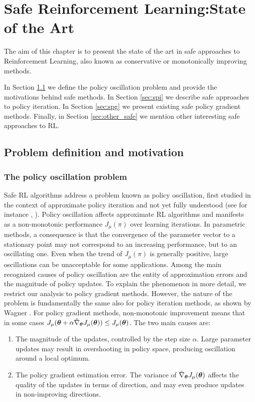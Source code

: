 \chapter{Safe Reinforcement Learning:\newline State of the Art}
The aim of this chapter is to present the state of the art in safe approaches to Reinforcement Learning, also known as conservative or monotonically improving methods. 

In Section \ref{sec:safe_def} we define the policy oscillation problem and provide the motivations behind safe methods. In Section \ref{sec:spi} we describe safe approaches to policy iteration. In Section \ref{sec:spg} we present existing safe policy gradient methods. Finally, in Section \ref{sec:other_safe} we mention other interesting safe approaches to \ac{RL}.

\section{Problem definition and motivation} \label{sec:safe_def}
\subsection{The policy oscillation problem}
Safe \ac{RL} algorithms address a problem known as policy oscillation, first studied in the context of approximate policy iteration and not yet fully understood (see for instance \cite{Bertsekas2011api}, \cite{wagner2011reinterpretation}). Policy oscillation affects approximate \ac{RL} algorithms and manifests as a non-monotonic performance $J_\mu(\pi)$ over learning iterations. In parametric methods, a consequence is that the convergence of the parameter vector to a stationary point may not correspond to an increasing performance, but to an oscillating one. Even when the trend of $J_\mu(\pi)$ is generally positive, large oscillations can be unacceptable for some applications.
Among the main recognized causes of policy oscillation are the entity of approximation errors and the magnitude of policy updates.
To explain the phenomenon in more detail, we restrict our analysis to policy gradient methods. However, the nature of the problem is fundamentally the same also for policy iteration methods, as shown by Wagner \cite{wagner2011reinterpretation}. For policy gradient methods, non-monotonic improvement means that in some cases $J_\mu(\boldsymbol{\theta}+\alpha\hat{\nabla}_{\boldsymbol{\theta}}J_{\mu}(\boldsymbol{\theta})) \leq J_\mu(\boldsymbol{\theta})$. The two main causes are:
\begin{enumerate}
\item The magnitude of the updates, controlled by the step size $\alpha$. Large parameter updates may result in overshooting in policy space, producing oscillation around a local optimum.
\item The policy gradient estimation error. The variance of $\hat{\nabla}_{\boldsymbol{\theta}}J_{\mu}(\boldsymbol{\theta})$ affects the quality of the updates in terms of direction, and may even produce updates in non-improving directions.
\end{enumerate} 

